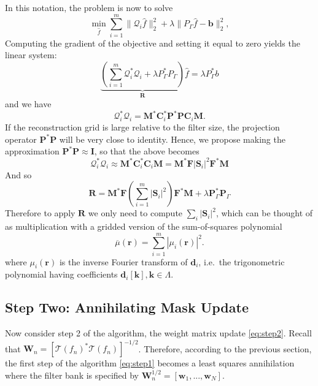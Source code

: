 \documentclass[a4paper]{article}
\begin{document}
In this notation, the problem is now to solve
\[
\min_{\hat f} \sum_{i=1}^m\|\mathcal{Q}_i \hat f\|_2^2 + \lambda\|P_{\Gamma} \hat f - \mathbf b\|_2^2,
\]
Computing the gradient of the objective and setting it equal to zero yields the linear system:
\[
\underbrace{\left(\sum_{i=1}^m \mathcal{Q}_i^*\mathcal{Q}_i  + \lambda P_{\Gamma}^* P_{\Gamma}\right )}_{\mathbf R} \hat f = \lambda P_{\Gamma}^* b
\]
and we have 
\[
 \mathcal{Q}_i^*\mathcal{Q}_i  = \mathbf M^* \mathbf C_i^* \mathbf P^*\mathbf P \mathbf C_i \mathbf M.
\]
If the reconstruction grid is large relative to the filter size, the projection operator $\mathbf P^*\mathbf P$ will be very close to identity. Hence, we propose making the approximation $\mathbf P^*\mathbf P \approx \mathbf I$, so that the above becomes 
\[
 \mathcal{Q}_i^*\mathcal{Q}_i  \approx \mathbf M^* \mathbf C_i^* \mathbf C_i \mathbf M = \mathbf M^* \mathbf F |\mathbf S_i|^2 \mathbf F^*\mathbf M 
\]
And so 
\[
\mathbf R = \mathbf M^* \mathbf F \left(\sum_{i=1}^m |\mathbf S_i|^2\right) \mathbf F^* \mathbf M + \lambda \mathbf P_{\Gamma}^* \mathbf P_{\Gamma}
\]
Therefore to apply $\mathbf R$ we only need to compute $\sum_i |\mathbf S_i|^2$, which can be thought of as multiplication with a gridded version of the sum-of-squares polynomial
\begin{equation}
\label{eq:sumofsquares}
\overline{\mu}(\mathbf r) = \sum_{i=1}^m |\mu_i(\mathbf r)|^2.
\end{equation}
where $\mu_i(\mathbf r)$ is the inverse Fourier transform of $\mathbf d_i$, i.e.\ the trigonometric polynomial having coefficients $\mathbf d_i[\mathbf k], \mathbf k \in \Lambda$.
\subsection{Step Two: Annihilating Mask Update}
Now consider step 2 of the algorithm, the weight matrix update \eqref{eq:step2}. Recall that $\mathbf W_n = [\mathcal{T}(f_n)^* \mathcal{T}(f_n)]^{-1/2}$. Therefore, according to the previous section, the first step of the algorithm \eqref{eq:step1} becomes a least squares annihilation where the filter bank is specified by $\mathbf W_n^{1/2} = [\mathbf w_1,..., \mathbf w_N]$.
\end{document}
